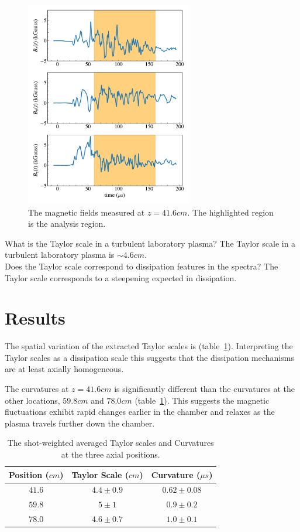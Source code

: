 \documentclass[%
 aip,
 amsmath,amssymb,
preprint,%
]{revtex4-1}
\begin{document}
\begin{figure}
\includegraphics[width=0.65\textwidth]{Figures/fields/bfields_time_num20.pdf}%
\caption{\label{fig:wave_psd} The magnetic fields measured at $z = 41.6cm$. The highlighted region is the analysis region.}
\end{figure}

What is the Taylor scale in a turbulent laboratory plasma?
The Taylor scale in a turbulent laboratory plasma is $\sim4.6cm$.\\

Does the Taylor scale correspond to dissipation features in the spectra?
The Taylor scale corresponds to a steepening expected in dissipation.

\section{Results}
The spatial variation of the extracted Taylor scales is  (table~\ref{tab:table1}). Interpreting the Taylor scales as a dissipation scale this suggests that the dissipation mechanisms are at least axially homogeneous. 

The curvatures at $z = 41.6cm$ is significantly different than the curvatures at the other locations, $59.8cm$ and $78.0cm$ (table~\ref{tab:table1}). This suggests the magnetic fluctuations exhibit rapid changes earlier in the chamber and relaxes as the plasma travels further down the chamber.
\begin{table}
\caption{\label{tab:table1} The shot-weighted averaged Taylor scales and Curvatures at the three axial positions.}
\begin{ruledtabular}
\begin{tabular}{ccc}
Position ($cm$)&Taylor Scale ($cm$)&Curvature ($\mu s$)\\
\hline
$41.6$ & $4.4\pm0.9$ & $0.62\pm0.08$\\
$59.8$ & $5\pm1$ & $0.9\pm0.2$\\
$78.0$ & $4.6\pm0.7$ & $1.0\pm0.1$\\
\end{tabular}
\end{ruledtabular}
\end{table}
\end{document}
